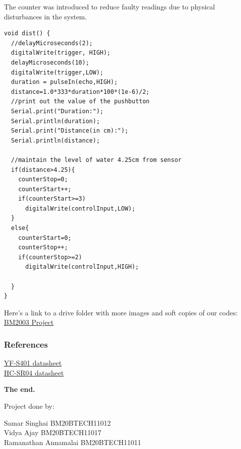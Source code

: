 \documentclass[12pt]{article}
\begin{document}
The counter was introduced to reduce faulty readings due to physical disturbances in the system.
\begin{lstlisting}[style=Cstyle]
void dist() {
  //delayMicroseconds(2);
  digitalWrite(trigger, HIGH);
  delayMicroseconds(10);
  digitalWrite(trigger,LOW);
  duration = pulseIn(echo,HIGH);
  distance=1.0*333*duration*100*(1e-6)/2;
  //print out the value of the pushbutton
  Serial.print("Duration:");
  Serial.println(duration);
  Serial.print("Distance(in cm):");
  Serial.println(distance);

  //maintain the level of water 4.25cm from sensor
  if(distance>4.25){
    counterStop=0;
    counterStart++;
    if(counterStart>=3)
      digitalWrite(controlInput,LOW);
  }
  else{
    counterStart=0;
    counterStop++;
    if(counterStop>=2)
      digitalWrite(controlInput,HIGH);
  
  }
}
\end{lstlisting}

Here's a link to a drive folder with more images and soft copies of our codes: \href{https://drive.google.com/drive/folders/1zCMMhSyvWyliZltZAFARa_KcmfMKBSfn?usp=sharing}{BM2003 Project}

\subsubsection*{References}
\href{https://www.epitran.it/ebayDrive/datasheet/YF-S401.pdf}{YF-S401 datasheet}\\
\href{https://cdn.sparkfun.com/datasheets/Sensors/Proximity/HCSR04.pdf}{HC-SR04 datasheet}

\begin{center}
   \textbf{The end.}
\end{center}


Project done by:

Samar Singhai   BM20BTECH11012\\
Vidya Ajay   BM20BTECH11017\\
Ramanathan Annamalai  BM20BTECH11011

\pagebreak
\end{document}
